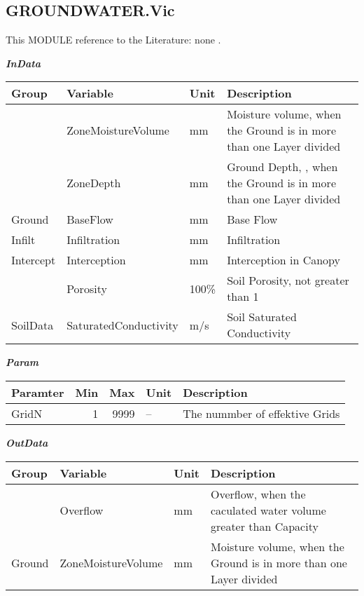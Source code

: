 \documentclass[
]{book}
\begin{document}
\hypertarget{GROUNDWATER.Vic}{%
\subsection{GROUNDWATER.Vic}\label{GROUNDWATER.Vic}}

This MODULE reference to the Literature: none \citep{none}.

\textbf{\emph{InData}}

\begin{table}[!h]
\centering
\begin{tabular}{l|l|l|l}
\hline
Group & Variable & Unit & Description\\
\hline
 & ZoneMoistureVolume & mm & Moisture volume, when the Ground is in more than one Layer divided\\
\cline{2-4}
 & ZoneDepth & mm & Ground Depth, , when the Ground is in more than one Layer divided\\
\cline{2-4}
\multirow{-3}{*}{\raggedright\arraybackslash Ground} & BaseFlow & mm & Base Flow\\
\cline{1-4}
Infilt & Infiltration & mm & Infiltration\\
\cline{1-4}
Intercept & Interception & mm & Interception in Canopy\\
\cline{1-4}
 & Porosity & 100\% & Soil Porosity, not greater than 1\\
\cline{2-4}
\multirow{-2}{*}{\raggedright\arraybackslash SoilData} & SaturatedConductivity & m/s & Soil Saturated Conductivity\\
\hline
\end{tabular}
\end{table}

\textbf{\emph{Param}}

\begin{table}[!h]
\centering
\begin{tabular}{l|r|r|l|l}
\hline
Paramter & Min & Max & Unit & Description\\
\hline
GridN & 1 & 9999 & -- & The nummber of effektive Grids\\
\hline
\end{tabular}
\end{table}

\textbf{\emph{OutData}}

\begin{table}[!h]
\centering
\begin{tabular}{l|l|l|l}
\hline
Group & Variable & Unit & Description\\
\hline
 & Overflow & mm & Overflow, when the caculated water volume greater than Capacity\\
\cline{2-4}
\multirow{-2}{*}{\raggedright\arraybackslash Ground} & ZoneMoistureVolume & mm & Moisture volume, when the Ground is in more than one Layer divided\\
\hline
\end{tabular}
\end{table}
\end{document}
